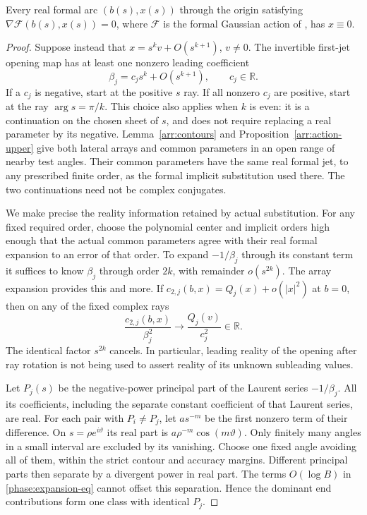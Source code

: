 \begin{theorem}\label{phase:no-arc}
Every real formal arc $(b(s),x(s))$ through the origin
satisfying $\nabla\mathcal F(b(s),x(s))=0$, where $\mathcal F$ is
the formal Gaussian action of , has $x\equiv0$.
\end{theorem}
\begin{proof}
Suppose instead that
$x=s^k v+O(s^{k+1})$, $v\ne0$.
The invertible first-jet opening map has at least one nonzero leading
coefficient
\[
 \beta_j=c_js^k+O(s^{k+1}),\qquad c_j\in\mathbb R.
\]
If a $c_j$ is negative, start at the positive $s$ ray.
If all nonzero $c_j$ are positive, start at the ray
$\arg s=\pi/k$.  This choice also applies when $k$ is even:
it is a continuation on the chosen sheet of $s$, and does not
require replacing a real parameter by its negative.
Lemma~\ref{arr:contours} and Proposition~\ref{arr:action-upper} give both
lateral arrays and common parameters in an open range of nearby test
angles.  Their common parameters have the same real formal jet, to any
prescribed finite order, as the formal implicit substitution used there.
The two continuations need not be complex conjugates.

We make precise the reality information retained by actual substitution.
For any fixed required order, choose the polynomial center and implicit
orders high enough that the actual common parameters agree with their
real formal expansion to an error of that order.  To expand $-1/\beta_j$
through its constant term it suffices to know $\beta_j$ through order
$2k$, with remainder $o(s^{2k})$.  The array expansion provides
this and more.  If $c_{2,j}(b,x)=Q_j(x)+o(|x|^2)$ at $b=0$, then on
any of the fixed complex rays
\begin{equation}
 \frac{c_{2,j}(b,x)}{\beta_j^2}
     \longrightarrow \frac{Q_j(v)}{c_j^2}\in\mathbb R.
 \label{phase:real-ratio}
\end{equation}
The identical factor $s^{2k}$ cancels.  In particular, leading
reality of the opening after ray rotation is not being used to assert
reality of its unknown subleading values.

Let $P_j(s)$ be the negative-power principal part of the Laurent
series $-1/\beta_j$.  All its coefficients, including the separate
constant coefficient of that Laurent series, are real.
For each pair with $P_i\ne P_j$, let $as^{-m}$ be the first
nonzero term of their difference.  On
$s=\rho e^{i\vartheta}$ its real part is
$a\rho^{-m}\cos(m\vartheta)$.  Only finitely many angles in a small
interval are excluded by its vanishing.  Choose one fixed angle avoiding
all of them, within the strict contour and accuracy margins.  Different
principal parts then separate by a divergent power in real part.
The terms $O(\log B)$ in \eqref{phase:expansion-eq} cannot offset this
separation.  Hence the dominant end contributions form one class with
identical $P_j$.


\end{proof}
